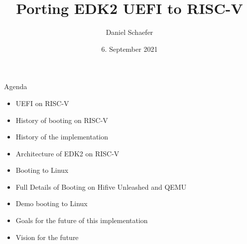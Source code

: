 \documentclass[
  10pt
]{beamer}
\title{Porting EDK2 UEFI to RISC-V}
\date{6. September 2021}
\author{Daniel Schaefer}
\begin{document}
\maketitle

\begin{frame}{Agenda}
  \begin{itemize}
    \item UEFI on RISC-V
    \item History of booting on RISC-V
    \item History of the implementation
    \item Architecture of EDK2 on RISC-V
    \item Booting to Linux
    \item Full Details of Booting on Hifive Unleashed and QEMU
    \item Demo booting to Linux
    \item Goals for the future of this implementation
    \item Vision for the future
  \end{itemize}
\end{frame}
\end{document}
